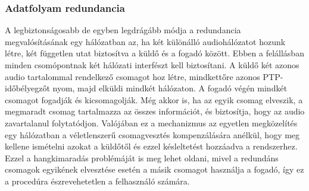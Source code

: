 \subsubsection{ Adatfolyam redundancia}
A legbiztonságosabb de egyben legdrágább módja a redundancia megvalósításának
egy hálózatban az, ha két különálló audiohálózatot hozunk létre, 
két független utat biztosítva a küldő és a fogadó között. 
Ebben a felállásban minden csomópontnak két hálózati interfészt
kell biztosítani. A küldő két azonos audio tartalommal rendelkező csomagot hoz létre,
mindkettőre azonos PTP-időbélyegzőt nyom, majd elküldi mindkét hálózaton.
A fogadó végén mindkét csomagot fogadják és kicsomagolják. Még akkor is, ha az egyik csomag
elveszik, a megmaradt csomag tartalmazza az összes információt, és biztosítja,
hogy az audio zavartalanul folytatódjon. Valójában ez a mechanizmus az egyetlen
megközelítés egy hálózatban a véletlenszerű csomagvesztés kompenzálására anélkül,
hogy meg kellene ismételni azokat a küldőtől és ezzel késleltetést hozzáadva a rendszerhez.
Ezzel a hangkimaradás problémáját is meg lehet oldani, mivel a redundáns csomagok
egyikének elvesztése esetén a másik csomagot használja a fogadó, így ez a procedúra
észrevehetetlen a felhasználó számára.
